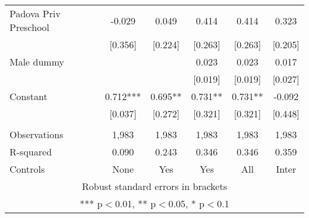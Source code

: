 \begin{tabular}{lccccc}
Padova Priv Preschool & -0.029 & 0.049 & 0.414 & 0.414 & 0.323 \\
 & [0.356] & [0.224] & [0.263] & [0.263] & [0.205] \\
Male dummy &  &  & 0.023 & 0.023 & 0.017 \\
 &  &  & [0.019] & [0.019] & [0.027] \\
Constant & 0.712*** & 0.695** & 0.731** & 0.731** & -0.092 \\
 & [0.037] & [0.272] & [0.321] & [0.321] & [0.448] \\
 &  &  &  &  &  \\
Observations & 1,983 & 1,983 & 1,983 & 1,983 & 1,983 \\
R-squared & 0.090 & 0.243 & 0.346 & 0.346 & 0.359 \\
 Controls & None & Yes & Yes & All & Inter \\ \hline
\multicolumn{6}{c}{ Robust standard errors in brackets} \\
\multicolumn{6}{c}{ *** p$<$0.01, ** p$<$0.05, * p$<$0.1} \\
\end{tabular}
